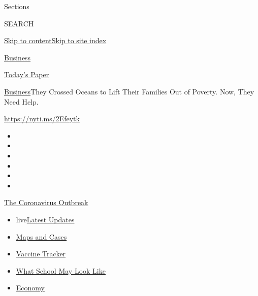 Sections

SEARCH

\protect\hyperlink{site-content}{Skip to
content}\protect\hyperlink{site-index}{Skip to site index}

\href{https://www.nytimes.com/section/business}{Business}

\href{https://myaccount.nytimes.com/auth/login?response_type=cookie\&client_id=vi}{}

\href{https://www.nytimes.com/section/todayspaper}{Today's Paper}

\href{/section/business}{Business}\textbar{}They Crossed Oceans to Lift
Their Families Out of Poverty. Now, They Need Help.

\url{https://nyti.ms/2Efeytk}

\begin{itemize}
\item
\item
\item
\item
\item
\item
\end{itemize}

\href{https://www.nytimes.com/news-event/coronavirus?action=click\&pgtype=Article\&state=default\&region=TOP_BANNER\&context=storylines_menu}{The
Coronavirus Outbreak}

\begin{itemize}
\tightlist
\item
  live\href{https://www.nytimes.com/2020/08/01/world/coronavirus-covid-19.html?action=click\&pgtype=Article\&state=default\&region=TOP_BANNER\&context=storylines_menu}{Latest
  Updates}
\item
  \href{https://www.nytimes.com/interactive/2020/us/coronavirus-us-cases.html?action=click\&pgtype=Article\&state=default\&region=TOP_BANNER\&context=storylines_menu}{Maps
  and Cases}
\item
  \href{https://www.nytimes.com/interactive/2020/science/coronavirus-vaccine-tracker.html?action=click\&pgtype=Article\&state=default\&region=TOP_BANNER\&context=storylines_menu}{Vaccine
  Tracker}
\item
  \href{https://www.nytimes.com/interactive/2020/07/29/us/schools-reopening-coronavirus.html?action=click\&pgtype=Article\&state=default\&region=TOP_BANNER\&context=storylines_menu}{What
  School May Look Like}
\item
  \href{https://www.nytimes.com/live/2020/07/31/business/stock-market-today-coronavirus?action=click\&pgtype=Article\&state=default\&region=TOP_BANNER\&context=storylines_menu}{Economy}
\end{itemize}

